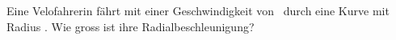 Eine Velofahrerin fährt mit einer Geschwindigkeit von \vVfO\ durch eine Kurve mit Radius \rVfO. Wie gross ist ihre Radialbeschleunigung?
